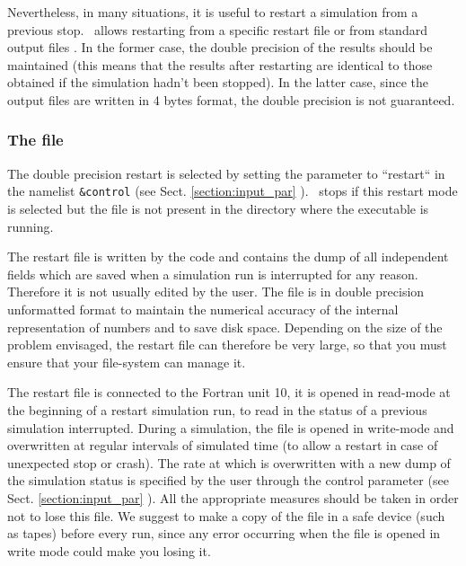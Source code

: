 Nevertheless, in many situations, it is useful to restart a simulation
from a previous stop. \PDAC\ allows restarting from a specific restart
file  or from standard output files .
In the former case, the double precision of the results should be maintained
(this means that the results after restarting are identical to those
obtained if the simulation hadn't been stopped). In the latter case,
since the output files are written in 4 bytes format, the double
precision is not guaranteed.

\subsubsection{The  file}

The double precision restart is selected by setting the 
parameter  to ``restart`` in the namelist {\tt \&control}
(see Sect. \ref{section:input_par} ). \PDAC\ stops if this 
restart mode is selected but the file  is not present 
in the directory where the executable is running.

The restart file is written by the code and
contains the dump of all independent fields which are saved when a
simulation run is interrupted for any reason. Therefore it is not 
usually edited by the user. 
The file is in double precision unformatted format 
to maintain the numerical 
accuracy of the internal representation of numbers and to save disk space. 
Depending on the size of the problem envisaged, the restart file can 
therefore be very large, so that you must ensure that your file-system 
can manage it.

The restart file is connected to the Fortran unit 10, it is
opened in read-mode at the beginning of a restart simulation run,
to read in the status of a previous simulation interrupted.
During a simulation, the  file is opened in 
write-mode and overwritten at regular intervals
of simulated time (to allow a restart in case of unexpected stop or crash). 
The rate at which  is overwritten
with a new dump of the simulation status is specified by
the user through the control parameter  
(see Sect. \ref{section:input_par} ).
All the appropriate measures should be taken in order
not to lose this file. We suggest to make a copy of the file in 
a safe device (such as tapes) before every run, since any error occurring
when the file is opened in write mode could make you losing it.

